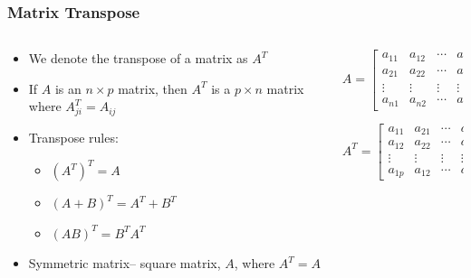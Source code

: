 \documentclass{beamer}
\begin{document}
\begin{frame}
  \frametitle{Matrix Transpose}

\begin{columns}
\begin{column}{5.5cm}

\begin{itemize}
	\item We denote the transpose of a matrix as $A^T$
	
\medskip	

  \item If $A$ is an $n \times p$ matrix, then $A^T$ is a $p \times n$ matrix where $A^T_{ji} = A_{ij}$

  \item Transpose rules:
  \begin{itemize}
  \item $(A^T)^T = A$
  \item $(A + B)^T = A^T + B^T$
  \item $(AB)^T = B^T A^T$
  \end{itemize}

  \item Symmetric matrix-- square matrix, $A$, where $A^T = A$

\end{itemize}

\end{column}

\begin{column}{5cm}

\[
A = \left[ \begin{array}{cccc}

a_{11} & a_{12} & \cdots & a_{1p} \\
a_{21} & a_{22} & \cdots & a_{2p} \\
\vdots & \vdots & \vdots & \vdots \\
a_{n1} & a_{n2} & \cdots & a_{np}
\end{array}
\right]
\]

\[
A^T = \left[ \begin{array}{cccc}

a_{11} & a_{21} & \cdots & a_{n1} \\
a_{12} & a_{22} & \cdots & a_{n2} \\
\vdots & \vdots & \vdots & \vdots \\
a_{1p} & a_{12} & \cdots & a_{np}
\end{array}
\right]
\]

\end{column}
\end{columns}



\end{frame}
\end{document}
